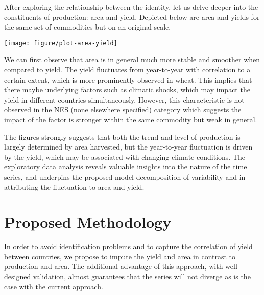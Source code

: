 \documentclass[nojss]{jss}\usepackage{graphicx, color}
\newenvironment{knitrout}{}{} %
\begin{document}
After exploring the relationship between the identity, let us delve
deeper into the constituents of production: area and yield. Depicted
below are area and yields for the same set of commodities but on an
original scale.
















\begin{knitrout}
\color{fgcolor}

{\centering \texttt{[image: figure/plot-area-yield]} 

}



\end{knitrout}


We can first observe that area is in general much more stable and
smoother when compared to yield. The yield fluctuates from
year-to-year with correlation to a certain extent, which is more
prominently observed in wheat. This implies that there maybe
underlying factors such as climatic shocks, which may impact the yield
in different countries simultaneously. However, this characteristic is
not observed in the NES (none elsewhere specified) category which
suggests the impact of the factor is stronger within the same
commodity but weak in general.


The figures strongly suggests that both the trend and level of 
production is largely determined by  area harvested, but the
year-to-year fluctuation is driven by the yield, which may be
associated with changing climate conditions. The exploratory data analysis
reveals valuable insights into the nature of the time series, and
underpins the proposed model decomposition of variability and in
attributing the fluctuation to area and yield.





\section{Proposed Methodology}
In order to avoid identification problems and to capture the
correlation of yield between countries, we propose to impute the yield
and area in contrast to production and area. The additional advantage
of this approach, with well designed validation, almost guarantees
that the series will not diverge as is the case with the current
approach.
\end{document}
